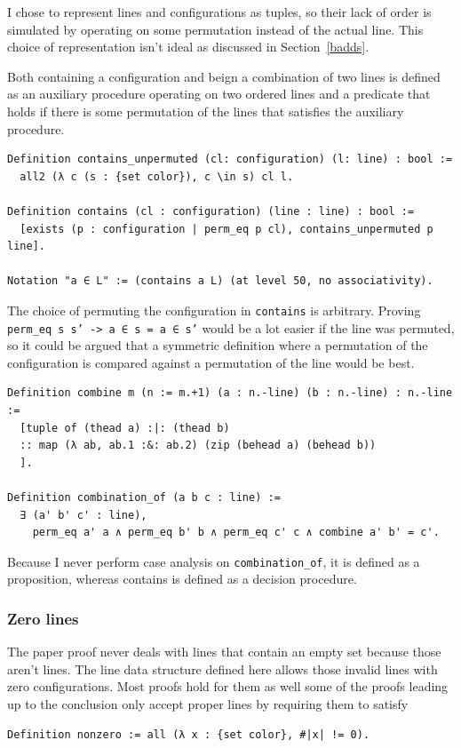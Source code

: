 \documentclass[english, 12pt, a4paper, sci, a-1b, online]{aaltothesis}
\newcommand\icoq[1]{\texttt{#1}}
\begin{document}
I chose to represent lines and configurations as tuples, so their lack of order is simulated by operating on some permutation instead of the actual line. This choice of representation isn't ideal as discussed in Section~\ref{badds}.

Both containing a configuration and beign a combination of two lines is defined as an auxiliary procedure operating on two ordered lines and a predicate that holds if there is some permutation of the lines that satisfies the auxiliary procedure.

\begin{verbatim}
Definition contains_unpermuted (cl: configuration) (l: line) : bool :=
  all2 (λ c (s : {set color}), c \in s) cl l.

Definition contains (cl : configuration) (line : line) : bool :=
  [exists (p : configuration | perm_eq p cl), contains_unpermuted p line].

Notation "a ∈ L" := (contains a L) (at level 50, no associativity).
\end{verbatim}

The choice of permuting the configuration in \icoq{contains} is arbitrary. Proving \icoq{perm_eq s s' -> a ∈ s = a ∈ s'} would be a lot easier if the line was permuted, so it could be argued that a symmetric definition where a permutation of the configuration is compared against a permutation of the line would be best.

\begin{verbatim}
Definition combine m (n := m.+1) (a : n.-line) (b : n.-line) : n.-line :=
  [tuple of (thead a) :|: (thead b)
  :: map (λ ab, ab.1 :&: ab.2) (zip (behead a) (behead b))
  ].

Definition combination_of (a b c : line) :=
  ∃ (a' b' c' : line),
    perm_eq a' a ∧ perm_eq b' b ∧ perm_eq c' c ∧ combine a' b' = c'.
\end{verbatim}

Because I never perform case analysis on \icoq{combination_of}, it is defined as a proposition, whereas contains is defined as a decision procedure.

\subsubsection{Zero lines}

The paper proof never deals with lines that contain an empty set because those aren't lines. The line data structure defined here allows those invalid lines with zero configurations. Most proofs hold for them as well some of the proofs leading up to the conclusion only accept proper lines by requiring them to satisfy
\begin{verbatim}
Definition nonzero := all (λ x : {set color}, #|x| != 0).
\end{verbatim}
\end{document}
